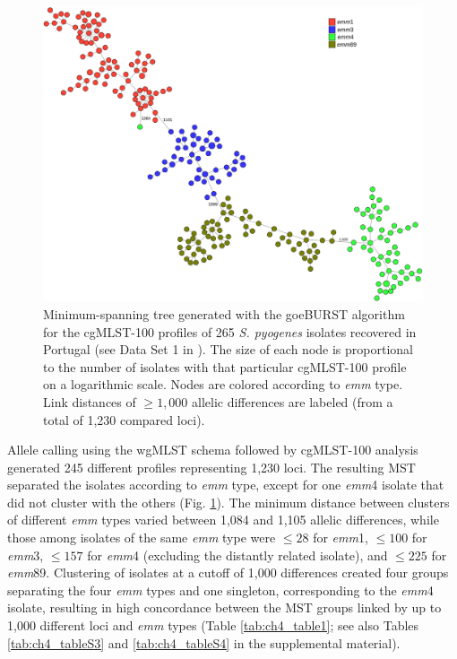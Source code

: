 \newpage
\begin{figure}[h!]
    \centering
    \includegraphics[width=\textwidth]{figures/chapter 4/Figure1.pdf}
    \caption[Minimum-spanning tree generated with the goeBURST algorithm for the cgMLST-100 proﬁles of 265 \textit{S. pyogenes} isolates recovered in Portugal.]{Minimum-spanning tree generated with the goeBURST algorithm for the cgMLST-100 proﬁles of 265 \textit{S. pyogenes} isolates recovered in Portugal (see Data Set 1 in \cite{friaes_supplemental_2023}). The size of each node is proportional to the number of isolates with that particular cgMLST-100 proﬁle on a logarithmic scale. Nodes are colored according to \textit{emm} type. Link distances of $\geq1,000$ allelic differences are labeled (from a total of 1,230 compared loci).}
    \label{fig:chap4_figure1}
\end{figure}

Allele calling using the \ac{wgMLST} schema followed by cgMLST-100 analysis generated 245 different proﬁles representing 1,230 loci. The resulting \ac{MST} separated the isolates according to \textit{emm} type, except for one \textit{emm}4 isolate that did not cluster with the others (Fig. \ref{fig:chap4_figure1}). The minimum distance between clusters of different \textit{emm} types varied between 1,084 and 1,105 allelic differences, while those among isolates of the same \textit{emm} type were $\leq28$ for \textit{emm}1, $\leq100$ for \textit{emm}3, $\leq157$ for \textit{emm}4 (excluding the distantly related isolate), and $\leq225$ for \textit{emm}89. Clustering of isolates at a cutoff of 1,000 differences created four groups separating the four \textit{emm} types and one singleton, corresponding to the \textit{emm}4 isolate, resulting in high concordance between the \ac{MST} groups linked by up to 1,000 different loci and \textit{emm} types (Table \ref{tab:ch4_table1}; see also Tables \ref{tab:ch4_tableS3} and \ref{tab:ch4_tableS4} in the supplemental material).

